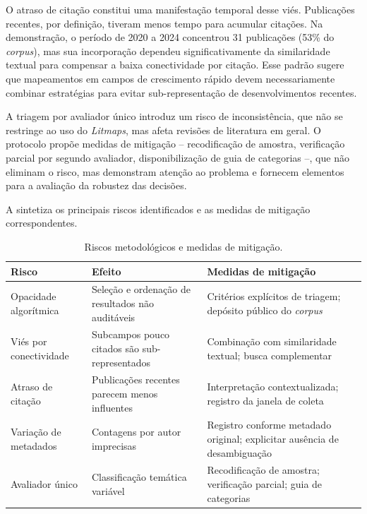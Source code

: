 \documentclass[portuguese]{textolivre}
\begin{document}
	O atraso de citação constitui uma manifestação temporal desse viés. Publicações recentes, por definição, tiveram menos tempo para acumular citações. Na demonstração, o período de 2020 a 2024 concentrou 31 publicações (53\% do \textit{corpus}), mas sua incorporação dependeu significativamente da similaridade textual para compensar a baixa conectividade por citação. Esse padrão sugere que mapeamentos em campos de crescimento rápido devem necessariamente combinar estratégias para evitar sub-representação de desenvolvimentos recentes.
    
	A triagem por avaliador único introduz um risco de inconsistência, que não se restringe ao uso do \textit{Litmaps}, mas afeta revisões de literatura em geral. O protocolo propõe medidas de mitigação – recodificação de amostra, verificação parcial por segundo avaliador, disponibilização de guia de categorias –, que não eliminam o risco, mas demonstram atenção ao problema e fornecem elementos para a avaliação da robustez das decisões.
    
	A  sintetiza os principais riscos identificados e as medidas de mitigação correspondentes.

\begin{table}[htbp]
\centering
\begin{threeparttable}
\caption{Riscos metodológicos e medidas de mitigação.}
\label{tab4}

\begin{tabularx}{\textwidth}{
    >{\raggedright\arraybackslash}p{3.2cm}
    >{\raggedright\arraybackslash}X
    >{\raggedright\arraybackslash}X}
\toprule
\textbf{Risco} & \textbf{Efeito} & \textbf{Medidas de mitigação} \\
\midrule

Opacidade algorítmica &
Seleção e ordenação de resultados não auditáveis &
Critérios explícitos de triagem; depósito público do \textit{corpus} \\

Viés por conectividade &
Subcampos pouco citados são sub-representados &
Combinação com similaridade textual; busca complementar \\

Atraso de citação &
Publicações recentes parecem menos influentes &
Interpretação contextualizada; registro da janela de coleta \\

Variação de metadados &
Contagens por autor imprecisas &
Registro conforme metadado original; explicitar ausência de desambiguação \\

Avaliador único &
Classificação temática variável &
Recodificação de amostra; verificação parcial; guia de categorias \\

\bottomrule
\end{tabularx}


\end{threeparttable}
\end{table}
\end{document}

